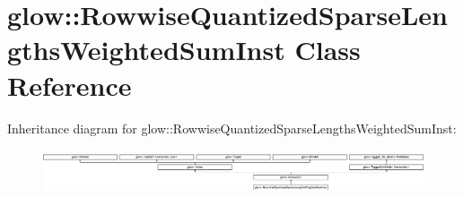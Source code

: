 \hypertarget{classglow_1_1_rowwise_quantized_sparse_lengths_weighted_sum_inst}{}\section{glow\+:\+:Rowwise\+Quantized\+Sparse\+Lengths\+Weighted\+Sum\+Inst Class Reference}
\label{classglow_1_1_rowwise_quantized_sparse_lengths_weighted_sum_inst}
Inheritance diagram for glow\+:\+:Rowwise\+Quantized\+Sparse\+Lengths\+Weighted\+Sum\+Inst\+:\begin{figure}[H]
\begin{center}
\leavevmode
\includegraphics[height=1.329377cm]{classglow_1_1_rowwise_quantized_sparse_lengths_weighted_sum_inst}
\end{center}
\end{figure}
